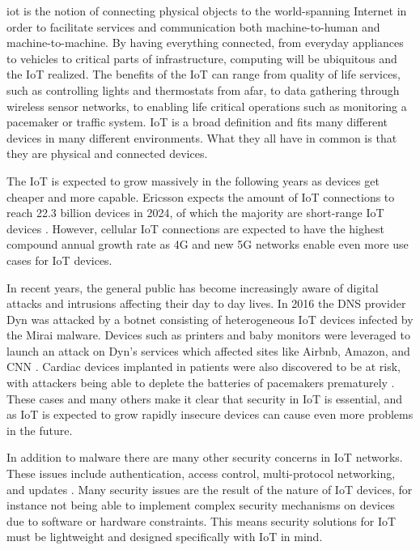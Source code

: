 \documentclass[0-thesis.tex]{subfiles}
\begin{document}
\gls{iot} is the notion of connecting physical objects to the world-spanning Internet in
order to facilitate services and communication both machine-to-human and
machine-to-machine. By having everything connected, from everyday appliances to vehicles
to critical parts of infrastructure, computing will be ubiquitous and the IoT realized.
The benefits of the IoT can range from quality of life services, such as controlling
lights and thermostats from afar, to data gathering through wireless sensor networks, to
enabling life critical operations such as monitoring a pacemaker or traffic system. IoT is
a broad definition and fits many different devices in many different environments. What
they all have in common is that they are physical and connected devices.

The IoT is expected to grow massively in the following years as devices get cheaper and
more capable. Ericsson expects the amount of IoT connections to reach 22.3 billion devices
in 2024, of which the majority are short-range IoT devices
\parencite{ericsson-mobility-report}. However, cellular IoT connections are expected to
have the highest compound annual growth rate as 4G and new 5G networks enable even more
use cases for IoT devices.

In recent years, the general public has become increasingly aware of digital attacks and
intrusions affecting their day to day lives. In 2016 the DNS provider Dyn was attacked by
a botnet consisting of heterogeneous IoT devices infected by the Mirai malware. Devices
such as printers and baby monitors were leveraged to launch an attack on Dyn's services
which affected sites like Airbnb, Amazon, and CNN \parencite{perlroth_2016}. Cardiac
devices implanted in patients were also discovered to be at risk, with attackers being
able to deplete the batteries of pacemakers prematurely \parencite{hern_2017}. These cases
and many others make it clear that security in IoT is essential, and as IoT is expected to
grow rapidly insecure devices can cause even more problems in the future.

In addition to malware there are many other security concerns in IoT networks. These
issues include authentication, access control, multi-protocol networking, and updates
\parencite{jing2014, hossain2015, alrawais2017}. Many security issues are the result of
the nature of IoT devices, for instance not being able to implement complex security
mechanisms on devices due to software or hardware constraints. This means security
solutions for IoT must be lightweight and designed specifically with IoT in mind.
\end{document}
